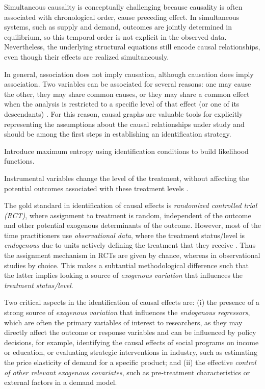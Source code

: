 Simultaneous causality is conceptually challenging because causality is often associated with chronological order, cause preceding effect. In simultaneous systems, such as supply and demand, outcomes are jointly determined in equilibrium, so this temporal order is not explicit in the observed data. Nevertheless, the underlying structural equations still encode causal relationships, even though their effects are realized simultaneously.

In general, association does not imply causation, although causation does imply association. Two variables can be associated for several reasons: one may cause the other, they may share common causes, or they may share a common effect when the analysis is restricted to a specific level of that effect (or one of its descendants) \cite{hernan2020causal}. For this reason, causal graphs are valuable tools for explicitly representing the assumptions about the causal relationships under study and should be among the first steps in establishing an identification strategy.

Introduce maximum entropy using identification conditions to build likelihood functions.

Instrumental variables change the level of the treatment, without affecting the potential outcomes associated with these treatment levels \cite{imbens2014ivperspective}.

The gold standard in identification of causal effects is \textit{randomized controlled trial (RCT)}, where assignment to treatment is random, independent of the outcome and other potential exogenous determinants of the outcome. However, most of the time practitioners use \textit{observational data}, where the treatment status/level is \textit{endogenous} due to units actively defining the treatment that they receive \cite{imbens2014ivperspective}. Thus the assignment mechanism in RCTs are given by chance, whereas in observational studies by choice. This makes a subtantial methodological difference such that the latter implies looking a source of \textit{exogenous variation} that influences the \textit{treatment status/level}.

Two critical aspects in the identification of causal effects are: (i) the presence of a strong source of \textit{exogenous variation} that influences the \textit{endogenous regressors}, which are often the primary variables of interest to researchers, as they may directly affect the outcome or response variables and can be influenced by policy decisions, for example, identifying the causal effects of social programs on income or education, or evaluating strategic interventions in industry, such as estimating the price elasticity of demand for a specific product; and (ii) the effective \textit{control of other relevant exogenous covariates}, such as pre-treatment characteristics or external factors in a demand model.

